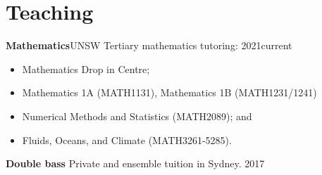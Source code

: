 
\section{Teaching}



\textbf{Mathematics}\hfill UNSW
\newline
Tertiary mathematics tutoring: \hfill 2021\textendash current
\begin{itemize}
    \item Mathematics Drop in Centre;
    \item Mathematics 1A (MATH1131), Mathematics 1B (MATH1231/1241)
    \item Numerical Methods and Statistics (MATH2089); and
    \item Fluids, Oceans, and Climate (MATH3261-5285).
\end{itemize}

\textbf{Double bass}
\newline
Private and ensemble tuition in Sydney. \hfill 2017